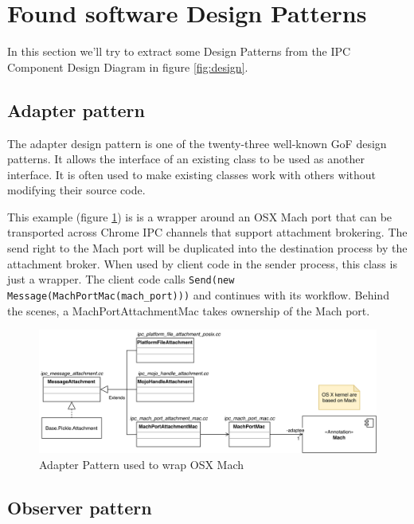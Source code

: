 \section{Found software Design Patterns}

In this section we'll try to extract some Design Patterns \cite{gammaetal} from the IPC Component Design Diagram in figure \ref{fig:design}.

\subsection{Adapter pattern}

The adapter design pattern is one of the twenty-three well-known GoF design patterns. It allows the interface of an existing class to be used as another interface. It is often used to make existing classes work with others without modifying their source code. 

This example (figure \ref{fig:adapter}) is is a wrapper around an OSX Mach port that can be transported across Chrome IPC channels that support attachment brokering. The send right to the Mach port will be duplicated into the destination process by the attachment broker. When used by client code in the sender process, this class is just a wrapper. The client code calls \texttt{Send(new Message(MachPortMac(mach\_port)))} and continues with its workflow. Behind the scenes, a MachPortAttachmentMac takes ownership of the Mach port. 
\begin{figure}[H]
    \centering
    \includegraphics[width=\textwidth]{img/adapter.png}
    \caption{Adapter Pattern used to wrap OSX Mach}
    \label{fig:adapter}
\end{figure}

\subsection{Observer pattern}

